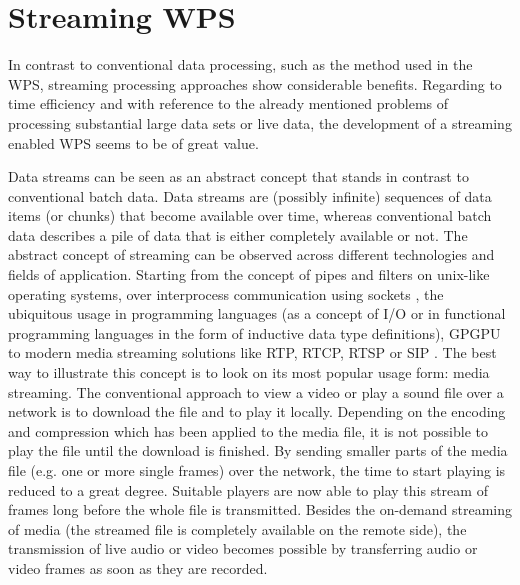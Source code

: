 
\chapter{Streaming WPS}
\label{sec:streamingwps}

In contrast to conventional data processing, such as the method used in the \ac{WPS}, streaming processing approaches show considerable benefits. Regarding to time efficiency and with reference to the already mentioned problems of processing substantial large data sets or live data, the development of a streaming enabled \ac{WPS} seems to be of great value.

Data streams can be seen as an abstract concept that stands in contrast to conventional batch data. Data streams are (possibly infinite) sequences of data items (or chunks) that become available over time, whereas conventional batch data describes a pile of data that is either completely available or not. The abstract concept of streaming can be observed across different technologies and fields of application. Starting from the concept of pipes and filters on unix-like operating systems, over interprocess communication using sockets \citep[either local or over a network,][]{buschmann1996pattern}, the ubiquitous usage in programming languages (as a concept of I/O or in functional programming languages in the form of inductive data type definitions), \ac{GPGPU} to modern media streaming solutions like RTP, RTCP, RTSP \citep{ietf:rfc3550,ietf:rfc2326} or SIP \citep{ietf:rfc3261}. The best way to illustrate this concept is to look on its most popular usage form: media streaming. The conventional approach to view a video or play a sound file over a network is to download the file and to play it locally. Depending on the encoding and compression which has been applied to the media file, it is not possible to play the file until the download is finished. By sending smaller parts of the media file (e.g. one or more single frames) over the network, the time to start playing is reduced to a great degree. Suitable players are now able to play this stream of frames long before the whole file is transmitted. Besides the on-demand streaming of media (the streamed file is completely available on the remote side), the transmission of live audio or video becomes possible by transferring audio or video frames as soon as they are recorded.

